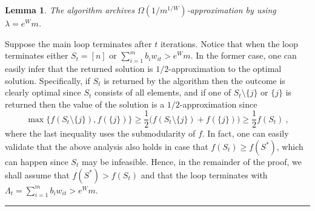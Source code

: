 \documentclass[11pt]{article}
\theoremstyle{plain}
\newtheorem{lemma}[theorem]{Lemma}
\theoremstyle{definition}
\newcommand{\qedsymb}{\hfill{\rule{2mm}{2mm}}}
\renewenvironment{proof}{\begin{trivlist} \item[\hspace{\labelsep}{\bf \noindent Proof.\/}] }{\qedsymb\end{trivlist}}\newenvironment{proofof}[1]{\begin{trivlist} \item[\hspace{\labelsep}{\bf \noindent Proof of #1.\/}] }{\qedsymb\end{trivlist}}\newenvironment{MyEqn}[1]{\setlength\arraycolsep{2pt}\begin{eqnarray*} #1}{\end{eqnarray*}}
\begin{document}
\begin{lemma} \label{lemma:Approx1}
The algorithm archives $\Omega(1 / m^{1/W})$-approximation by
using $\lambda = e^W m$.
\end{lemma}
\begin{proof}
Suppose the main loop terminates after $t$ iterations. Notice that
when the loop terminates either $S_t = [n]$ or $\sum_{i=1}^m b_i
w_{it} > e^W m$. In the former case, one can easily infer that the
returned solution is $1/2$-approximation to the optimal solution.
Specifically, if $S_t$ is returned by the algorithm then the
outcome is clearly optimal since $S_t$ consists of all elements,
and if one of $S_t \setminus \{j\}$ or $\{j\}$ is returned then
the value of the solution is a $1/2$-approximation since
$$
\max\big\{f(S_t \setminus \{j\}), f(\{j\})\big\} \geq
\frac{1}{2}\big(f(S_t \setminus \{j\}) + f(\{j\})\big) \geq
\frac{1}{2}f(S_t) \ ,
$$
where the last inequality uses the submodularity of $f$. In fact,
one can easily validate that the above analysis also holds in case
that $f(S_t) \geq f(S^*)$, which can happen since $S_t$ may be
infeasible. Hence, in the remainder of the proof, we shall assume
that $f(S^*) > f(S_t)$ and that the loop terminates with
$\Lambda_t = \sum_{i=1}^m b_i w_{it} > e^W m$.


\end{proof}
\end{document}
